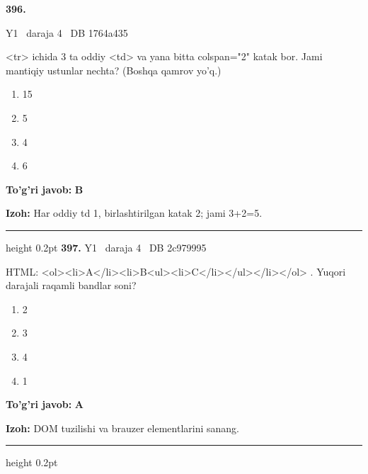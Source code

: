 \documentclass[10pt,a4paper,oneside]{article}
\begin{document}
\hypertarget{q396}{\textbf{\color{ink}396.}}  {\color{muted}\scriptsize Y1 \textbullet\ daraja 4 \textbullet\ DB 1764a435}
\par
\textless{}tr\textgreater{} ichida 3 ta oddiy \textless{}td\textgreater{} va yana bitta colspan="2" katak bor. Jami mantiqiy ustunlar nechta? (Boshqa qamrov yo'q.)
\begin{enumerate}[label=\Alph*),leftmargin=9mm]
\item 15
\item 5
\item 4
\item 6
\end{enumerate}
\begin{tcolorbox}[enhanced,breakable,colback=teal!4,colframe=teal!45!black,boxrule=0.45pt,arc=1.2mm,left=2.8mm,right=2.8mm,top=2mm,bottom=2mm,before skip=2mm,after skip=2mm]
\textbf{\color{teal}To'g'ri javob:} \textbf{B}
\par\smallskip
\textbf{Izoh:} Har oddiy td 1, birlashtirilgan katak 2; jami 3+2=5.
\end{tcolorbox}
\vspace{2mm}\hrule height 0.2pt \vspace{4mm}
\hypertarget{q397}{\textbf{\color{ink}397.}}  {\color{muted}\scriptsize Y1 \textbullet\ daraja 4 \textbullet\ DB 2c979995}
\par
HTML: \textless{}ol\textgreater{}\textless{}li\textgreater{}A\textless{}/li\textgreater{}\textless{}li\textgreater{}B\textless{}ul\textgreater{}\textless{}li\textgreater{}C\textless{}/li\textgreater{}\textless{}/ul\textgreater{}\textless{}/li\textgreater{}\textless{}/ol\textgreater{} . Yuqori darajali raqamli bandlar soni?
\begin{enumerate}[label=\Alph*),leftmargin=9mm]
\item 2
\item 3
\item 4
\item 1
\end{enumerate}
\begin{tcolorbox}[enhanced,breakable,colback=teal!4,colframe=teal!45!black,boxrule=0.45pt,arc=1.2mm,left=2.8mm,right=2.8mm,top=2mm,bottom=2mm,before skip=2mm,after skip=2mm]
\textbf{\color{teal}To'g'ri javob:} \textbf{A}
\par\smallskip
\textbf{Izoh:} DOM tuzilishi va brauzer elementlarini sanang.
\end{tcolorbox}
\vspace{2mm}\hrule height 0.2pt \vspace{4mm}
\end{document}
